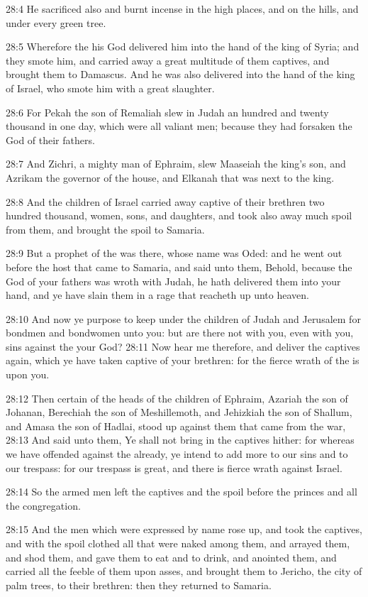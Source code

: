 28:4 He sacrificed also and burnt incense in the high places, and on the hills, and under every green tree.

28:5 Wherefore the \LORD his God delivered him into the hand of the king of Syria; and they smote him, and carried away a great multitude of them captives, and brought them to Damascus. And he was also delivered into the hand of the king of Israel, who smote him with a great slaughter.

28:6 For Pekah the son of Remaliah slew in Judah an hundred and twenty thousand in one day, which were all valiant men; because they had forsaken the \LORD God of their fathers.

28:7 And Zichri, a mighty man of Ephraim, slew Maaseiah the king's son, and Azrikam the governor of the house, and Elkanah that was next to the king.

28:8 And the children of Israel carried away captive of their brethren two hundred thousand, women, sons, and daughters, and took also away much spoil from them, and brought the spoil to Samaria.

28:9 But a prophet of the \LORD was there, whose name was Oded: and he went out before the host that came to Samaria, and said unto them, Behold, because the \LORD God of your fathers was wroth with Judah, he hath delivered them into your hand, and ye have slain them in a rage that reacheth up unto heaven.

28:10 And now ye purpose to keep under the children of Judah and Jerusalem for bondmen and bondwomen unto you: but are there not with you, even with you, sins against the \LORD your God?  28:11 Now hear me therefore, and deliver the captives again, which ye have taken captive of your brethren: for the fierce wrath of the \LORD is upon you.

28:12 Then certain of the heads of the children of Ephraim, Azariah the son of Johanan, Berechiah the son of Meshillemoth, and Jehizkiah the son of Shallum, and Amasa the son of Hadlai, stood up against them that came from the war, 28:13 And said unto them, Ye shall not bring in the captives hither: for whereas we have offended against the \LORD already, ye intend to add more to our sins and to our trespass: for our trespass is great, and there is fierce wrath against Israel.

28:14 So the armed men left the captives and the spoil before the princes and all the congregation.

28:15 And the men which were expressed by name rose up, and took the captives, and with the spoil clothed all that were naked among them, and arrayed them, and shod them, and gave them to eat and to drink, and anointed them, and carried all the feeble of them upon asses, and brought them to Jericho, the city of palm trees, to their brethren: then they returned to Samaria.

